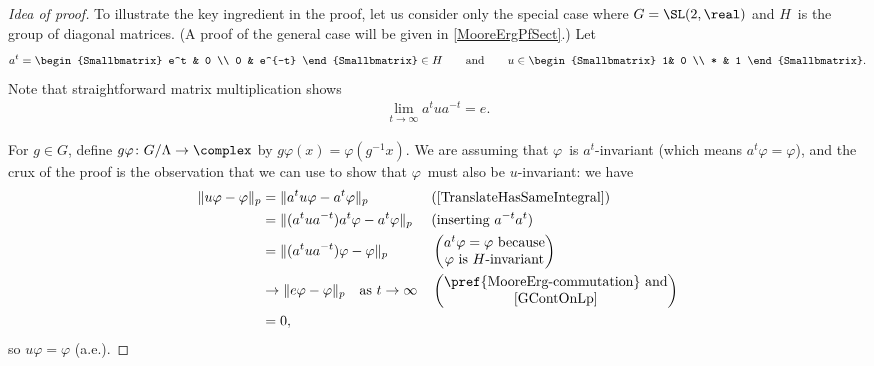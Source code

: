 \begin{proof}[Idea of proof]
To illustrate the key ingredient in the proof, let us consider only the special case where 
	$G = \SL(2,\real)$
	and 
	 $H$~is the group of diagonal matrices. 
(A proof of the general case will be given in \cref{MooreErgPfSect}.) Let
	$$ a^t = \begin{Smallbmatrix} e^t & 0 \\ 0 & e^{-t} \end{Smallbmatrix} \in H
	\qquad \text{and} \qquad
	u \in \begin{Smallbmatrix} 1& 0 \\ * & 1 \end{Smallbmatrix} .$$
Note that straightforward matrix multiplication  shows
	\begin{align} \label{MooreErg-commutation}
	\lim_{t \to \infty} a^t u a^{-t} = e
	. \end{align}

For $g \in G$, define $g \varphi \colon G/\Lambda \to \complex$ by $g\varphi(x) = \varphi(g^{-1} x)$.
We are assuming that $\varphi$~is $a^t$-invariant (which means $a^t \varphi = \varphi$), and the crux of the proof is the observation that we can use  to show that $\varphi$~must also be $u$-invariant:
we have
	\begin{align*}
	 \|u \varphi - \varphi \|_p
	&= \| a^t u \varphi - a^t \varphi \|_p 
	&& \text{(\cref{TranslateHasSameIntegral})}
	\\&= \| (a^t u a^{-t}) a^t \varphi - a^t \varphi\|_p 
	&& \text{(inserting $a^{-t} a^t$)}
	\\&= \| (a^t u a^{-t}) \varphi - \varphi \|_p 
	&& \begin{pmatrix} \text{$a^t \varphi = \varphi$ because} \\  \text{$\varphi$ is $H$-invariant} \end{pmatrix}
	\\&\to \| e \varphi - \varphi \|_p \quad \text{as $t \to \infty$} 
	&& \begin{pmatrix} \text{\pref{MooreErg-commutation} and} \\ \text{\cref{GContOnLp}} \end{pmatrix}
	\\&= 0
	, \end{align*}
so $u\varphi = \varphi$ (a.e.). 


\end{proof}
